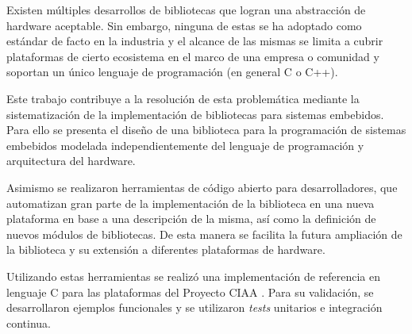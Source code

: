 Existen múltiples desarrollos de bibliotecas que logran una abstracción de hardware aceptable. Sin embargo, ninguna de estas se ha adoptado como estándar de facto en la industria y el alcance de las mismas se limita a cubrir plataformas de cierto ecosistema en el marco de una empresa o comunidad y soportan un único lenguaje de programación (en general C o C++).

Este trabajo contribuye a la resolución de esta problemática mediante la sistematización de la implementación de bibliotecas para sistemas embebidos. Para ello se presenta el diseño de una biblioteca para la programación de sistemas embebidos modelada independientemente del lenguaje de programación y arquitectura del hardware. 

Asimismo se realizaron herramientas de código abierto para desarrolladores, que automatizan gran parte de la implementación de la biblioteca en una nueva plataforma en base a una descripción de la misma, así como la definición de nuevos módulos de bibliotecas. De esta manera se facilita la futura ampliación de la biblioteca y su extensión a diferentes plataformas de hardware.		

Utilizando estas herramientas se realizó una implementación de referencia en lenguaje C para las plataformas del Proyecto CIAA \citep{CIAA}.
Para su validación, se desarrollaron ejemplos funcionales y se utilizaron \emph{tests} unitarios e integración continua.
